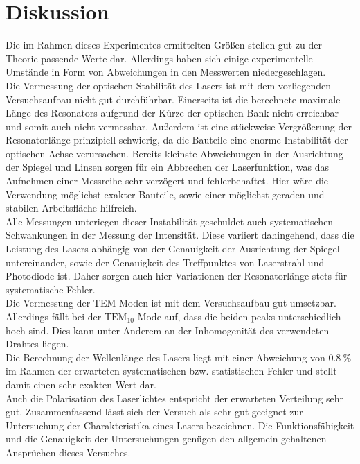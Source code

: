 \section{Diskussion}
\label{sec:diskussion}
%
Die im Rahmen dieses Experimentes ermittelten Größen stellen gut zu der Theorie passende Werte dar. Allerdings haben sich einige experimentelle
Umstände in Form von Abweichungen in den Messwerten niedergeschlagen.\\
Die Vermessung der optischen Stabilität des Lasers ist mit dem vorliegenden Versuchsaufbau nicht gut durchführbar. Einerseits ist die berechnete
maximale Länge des Resonators aufgrund der Kürze der optischen Bank nicht erreichbar und somit auch nicht vermessbar.
Außerdem ist eine stückweise Vergrößerung der Resonatorlänge prinzipiell schwierig, da die Bauteile eine enorme Instabilität der optischen
Achse verursachen. Bereits kleinste Abweichungen in der Ausrichtung der Spiegel und Linsen sorgen für ein Abbrechen der Laserfunktion, was
das Aufnehmen einer Messreihe sehr verzögert und fehlerbehaftet. Hier wäre die Verwendung möglichst exakter Bauteile, sowie einer möglichst
geraden und stabilen Arbeitsfläche hilfreich.\\
Alle Messungen unteriegen dieser Instabilität geschuldet auch systematischen Schwankungen in der Messung der Intensität. Diese variiert
dahingehend, dass die Leistung des Lasers abhängig von der Genauigkeit der Ausrichtung der Spiegel untereinander, sowie der Genauigkeit des
Treffpunktes von Laserstrahl und Photodiode ist. Daher sorgen auch hier Variationen der Resonatorlänge stets für systematische Fehler.\\
Die Vermessung der TEM-Moden ist mit dem Versuchsaufbau gut umsetzbar. Allerdings fällt bei der $\text{TEM}_{10}$-Mode auf, dass die beiden peaks
unterschiedlich hoch sind. Dies kann unter Anderem an der Inhomogenität des verwendeten Drahtes liegen.\\
Die Berechnung der Wellenlänge des Lasers liegt mit einer Abweichung von $\SI{0.8}{\percent}$ im Rahmen der erwarteten systematischen bzw.
statistischen Fehler und stellt damit einen sehr exakten Wert dar. \\
Auch die Polarisation des Laserlichtes entspricht der erwarteten Verteilung sehr gut. Zusammenfassend lässt sich der Versuch als sehr gut geeignet
zur Untersuchung der Charakteristika eines Lasers bezeichnen. Die Funktionsfähigkeit und die Genauigkeit der Untersuchungen genügen den allgemein
gehaltenen Ansprüchen dieses Versuches.
